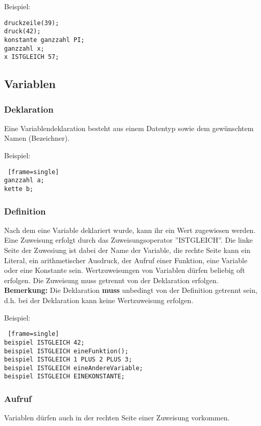 \documentclass[12pt, a4paper, oneside, ngerman]{article}
\begin{document}
\medskip
\noindent
Beispiel: \begin{lstlisting}[frame=single] 
druckzeile(39);
druck(42);
konstante ganzzahl PI;
ganzzahl x;
x ISTGLEICH 57;
\end{lstlisting}

\subsection{Variablen}
\subsubsection{Deklaration}
Eine Variablendeklaration besteht aus einem Datentyp sowie dem gewünschtem Namen (Bezeichner).

\medskip
\noindent
Beispiel:
\begin{lstlisting} [frame=single] 
ganzzahl a;
kette b;
\end{lstlisting}

\subsubsection{Definition}
Nach dem eine Variable deklariert wurde, kann ihr ein Wert zugewiesen werden. 
Eine Zuweisung erfolgt durch das Zuweisungsoperator ''ISTGLEICH''. 
Die linke Seite der Zuwesiung ist dabei der Name der Variable, die rechte Seite kann ein Literal, ein arithmetischer Ausdruck, der Aufruf einer Funktion, eine Variable oder eine Konstante sein.
Wertzuweisungen von Variablen dürfen beliebig oft erfolgen. 
Die Zuweisung muss getrennt von der Deklaration erfolgen. \\

\medskip
\noindent
\textbf{Bemerkung:} Die Deklaration \textbf{muss} unbedingt von der Definition getrennt sein, d.h. bei der Deklaration kann keine Wertzuweisung erfolgen.

\medskip
\noindent
Beispiel:
\begin{lstlisting} [frame=single] 
beispiel ISTGLEICH 42;
beispiel ISTGLEICH eineFunktion();
beispiel ISTGLEICH 1 PLUS 2 PLUS 3;
beispiel ISTGLEICH eineAndereVariable;
beispiel ISTGLEICH EINEKONSTANTE;
\end{lstlisting}


\subsubsection{Aufruf}
Variablen dürfen auch in der rechten Seite einer Zuweisung vorkommen.
\end{document}
